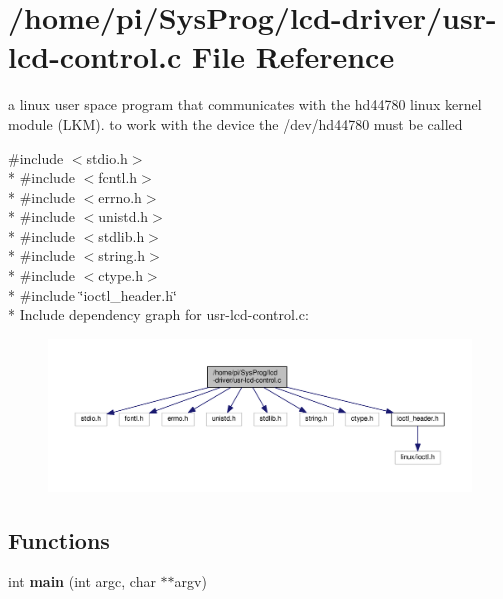 \hypertarget{usr-lcd-control_8c}{\section{/home/pi/\+Sys\+Prog/lcd-\/driver/usr-\/lcd-\/control.c File Reference}
\label{usr-lcd-control_8c}
}


a linux user space program that communicates with the hd44780 linux kernel module (L\+K\+M). to work with the device the /dev/hd44780 must be called  


{\ttfamily \#include $<$stdio.\+h$>$}\\*
{\ttfamily \#include $<$fcntl.\+h$>$}\\*
{\ttfamily \#include $<$errno.\+h$>$}\\*
{\ttfamily \#include $<$unistd.\+h$>$}\\*
{\ttfamily \#include $<$stdlib.\+h$>$}\\*
{\ttfamily \#include $<$string.\+h$>$}\\*
{\ttfamily \#include $<$ctype.\+h$>$}\\*
{\ttfamily \#include \char`\"{}ioctl\+\_\+header.\+h\char`\"{}}\\*
Include dependency graph for usr-\/lcd-\/control.c\+:\nopagebreak
\begin{figure}[H]
\begin{center}
\leavevmode
\includegraphics[width=350pt]{usr-lcd-control_8c__incl}
\end{center}
\end{figure}
\subsection*{Functions}
\begin{DoxyCompactItemize}
\item 
\hypertarget{usr-lcd-control_8c_a3c04138a5bfe5d72780bb7e82a18e627}{int {\bfseries main} (int argc, char $\ast$$\ast$argv)}\label{usr-lcd-control_8c_a3c04138a5bfe5d72780bb7e82a18e627}

\end{DoxyCompactItemize}


